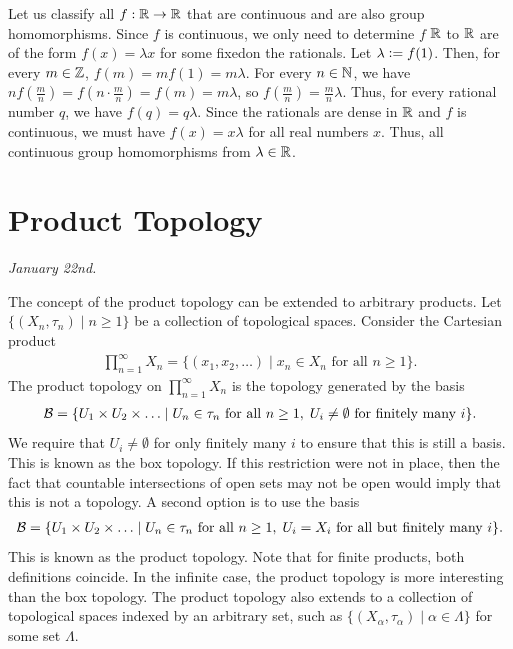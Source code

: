 \begin{example}
    Let us classify all $f:\mathbb{R} \to \mathbb{R}$ that are continuous and are also group homomorphisms. Since $f$ is continuous, we only need to determine $f$  $\mathbb{R}$ to $\mathbb{R}$ are of the form $f(x) = \lambda x$ for some fixedon the rationals. Let $\lambda \vcentcolon= f(1)$. Then, for every $m \in \mathbb{Z}$, $f(m) = m f(1) = m \lambda$. For every $n \in \mathbb{N}$, we have $n f(\frac{m}{n}) = f(n \cdot \frac{m}{n}) = f(m) = m \lambda$, so $f(\frac{m}{n}) = \frac{m}{n} \lambda$. Thus, for every rational number $q$, we have $f(q) = q \lambda$. Since the rationals are dense in $\mathbb{R}$ and $f$ is continuous, we must have $f(x) = x \lambda$ for all real numbers $x$. Thus, all continuous group homomorphisms from $\lambda \in \mathbb{R}$.
\end{example}


\section{Product Topology}
\noindent\textit{January 22nd.}

The concept of the product topology can be extended to arbitrary products. Let $\{(X_{n}, \tau_{n}) \mid n \geq 1\}$ be a collection of topological spaces. Consider the Cartesian product
\begin{align}
    \prod_{n=1}^{\infty} X_{n} = \{(x_{1}, x_{2}, \ldots) \mid x_{n} \in X_{n} \text{ for all } n \geq 1\}.
\end{align}
The product topology on $\prod_{n=1}^{\infty} X_{n}$ is the topology generated by the basis
\begin{align}
    \mathcal{B} = \{U_{1} \times U_{2} \times \ldots \mid U_{n} \in \tau_{n} \text{ for all } n \geq 1,\; U_{i} \neq \emptyset \text{ for finitely many } i\}.
\end{align}
We require that $U_{i} \neq \emptyset$ for only finitely many $i$ to ensure that this is still a basis. This is known as the box topology. If this restriction were not in place, then the fact that countable intersections of open sets may not be open would imply that this is not a topology. A second option is to use the basis
\begin{align}
    \mathcal{B} = \{U_{1} \times U_{2} \times \ldots \mid U_{n} \in \tau_{n} \text{ for all } n \geq 1,\; U_{i} = X_{i} \text{ for all but finitely many } i\}.
\end{align}
This is known as the product topology. Note that for finite products, both definitions coincide. In the infinite case, the product topology is more interesting than the box topology. The product topology also extends to a collection of topological spaces indexed by an arbitrary set, such as $\{(X_{\alpha}, \tau_{\alpha}) \mid \alpha \in \Lambda\}$ for some set $\Lambda$.

